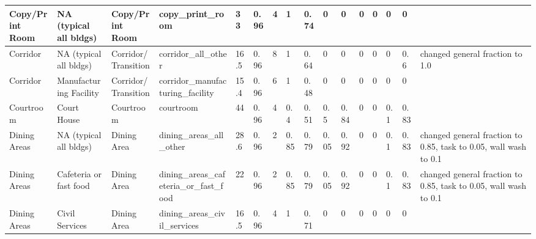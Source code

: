 \begin{center}
\begin{landscape}
\begin{longtable}{|p{0.75in}|p{0.75in}|p{0.75in}|p{0.75in}|p{0.3in}|p{0.3in}|p{0.3in}|p{0.3in}|p{0.3in}|p{0.3in}|p{0.3in}|p{0.3in}|p{0.3in}|p{0.3in}|p{0.3in}|p{0.6in}|}
      Copy/Print Room                         & NA (typical all bldgs)      & Copy/Print Room                                 & copy\_print\_room                                               & 33   & 0.96 & 4  & 1      & 0.74  & 0     & 0     & 0    & 0    & 0    & 0    &                                                                                       \\ \hline
      Corridor                                & NA (typical all bldgs)      & Corridor/Transition                             & corridor\_all\_other                                            & 16.5 & 0.96 & 8  & 1      & 0.64  & 0     & 0     & 0    & 0    & 0    & 0.6  & changed general fraction to 1.0                                                       \\ \hline
      Corridor                                & Manufacturing Facility      & Corridor/Transition                             & corridor\_manufacturing\_facility                               & 15.4 & 0.96 & 6  & 1      & 0.48  & 0     & 0     & 0    & 0    & 0    & 0    &                                                                                       \\ \hline
      Courtroom                               & Court House                 & Courtroom                                       & courtroom                                                       & 44   & 0.96 & 4  & 0.4    & 0.51  & 0.5   & 0.84  & 0    & 0    & 0.1  & 0.83 &                                                                                       \\ \hline
      Dining Areas                            & NA (typical all bldgs)      & Dining Area                                     & dining\_areas\_all\_other                                       & 28.6 & 0.96 & 2  & 0.85   & 0.79  & 0.05  & 0.92  & 0    & 0    & 0.1  & 0.83 & changed general fraction to 0.85, task to 0.05, wall wash to 0.1                      \\ \hline
      Dining Areas                            & Cafeteria or fast food      & Dining Area                                     & dining\_areas\_cafeteria\_or\_fast\_food                        & 22   & 0.96 & 2  & 0.85   & 0.79  & 0.05  & 0.92  & 0    & 0    & 0.1  & 0.83 & changed general fraction to 0.85, task to 0.05, wall wash to 0.1                      \\ \hline
      Dining Areas                            & Civil Services              & Dining Area                                     & dining\_areas\_civil\_services                                  & 16.5 & 0.96 & 4  & 1      & 0.71  & 0     & 0     & 0    & 0    & 0    & 0    &                                                                                       \\ \hline

\end{longtable}
\end{landscape}
\end{center}
